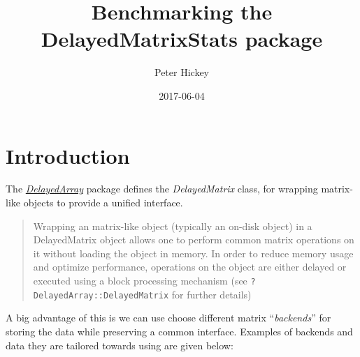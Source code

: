 \documentclass[]{book}
\title{Benchmarking the DelayedMatrixStats package}
\author{Peter Hickey}
\date{2017-06-04}
\begin{document}
\maketitle

{
\setcounter{tocdepth}{1}
\tableofcontents
}
\chapter{Introduction}\label{introduction}

The
\emph{\href{http://bioconductor.org/packages/DelayedArray}{DelayedArray}}
package defines the \emph{DelayedMatrix} class, for wrapping matrix-like
objects to provide a unified interface.

\begin{quote}
Wrapping an matrix-like object (typically an on-disk object) in a
DelayedMatrix object allows one to perform common matrix operations on
it without loading the object in memory. In order to reduce memory usage
and optimize performance, operations on the object are either delayed or
executed using a block processing mechanism (see
\texttt{?DelayedArray::DelayedMatrix} for further details)
\end{quote}

A big advantage of this is we can use choose different matrix
``\emph{backends}'' for storing the data while preserving a common
interface. Examples of backends and data they are tailored towards using
are given below:
\end{document}
